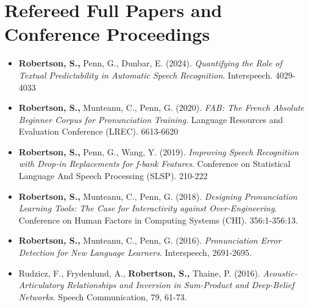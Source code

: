 \documentclass{article}
\begin{document}
\section{Refereed Full Papers and Conference Proceedings}
\begin{itemize}
  \item \textbf{Robertson, S.,} Penn, G., Dunbar, E. (2024).
    \textit{Quantifying the Role of Textual Predictability in Automatic Speech
    Recognition}. Interspeech. 4029-4033

  \item \textbf{Robertson, S.,} Munteanu, C., Penn, G. (2020).
    \textit{FAB: The French Absolute Beginner Corpus for Pronunciation
    Training}. Language Resources and Evaluation Conference (LREC). 6613-6620

  \item \textbf{Robertson, S.,} Penn, G., Wang, Y. (2019).
    \textit{Improving Speech Recognition with Drop-in Replacements for f-bank
    Features}. Conference on Statistical Language And Speech Processing
    (SLSP). 210-222

  \item \textbf{Robertson, S.,} Munteanu, C., Penn, G. (2018).
    \textit{Designing Pronunciation Learning Tools: The Case for Interactivity
    against Over-Engineering}. Conference on Human Factors in Computing Systems
    (CHI). 356:1-356:13.

  \item \textbf{Robertson, S.,} Munteanu, C., Penn, G. (2016).
    \textit{Pronunciation Error Detection for New Language Learners}.
    Interspeech, 2691-2695.

  \item Rudzicz, F., Frydenlund, A., \textbf{Robertson, S.,} Thaine, P. (2016).
    \textit{Acoustic-Articulatory Relationships and Inversion in Sum-Product
    and Deep-Belief Networks}. Speech Communication, 79, 61-73.
\end{itemize}
\end{document}
